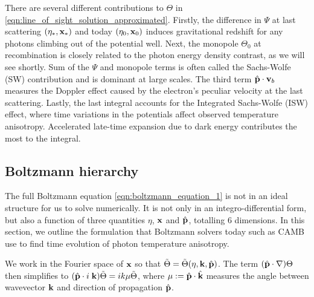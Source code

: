 There are several different contributions to $\Theta$ in \eqref{eqn:line_of_sight_solution_approximated}. Firstly, the difference in $\Psi$ at last scattering $(\eta_*,\mathbf{x}_*)$ and today $(\eta_0, \mathbf{x}_0)$ induces gravitational redshift for any photons climbing out of the potential well. Next, the monopole $\Theta_0$ at recombination is closely related to the photon energy density contrast, as we will see shortly. Sum of the $\Psi$ and monopole terms is often called the Sachs-Wolfe (SW) contribution and is dominant at large scales. The third term $\hat{\mathbf{p}}\cdot\mathbf{v}_b$ measures the Doppler effect caused by the electron's peculiar velocity at the last scattering. Lastly, the last integral accounts for the Integrated Sachs-Wolfe (ISW) effect, where time variations in the potentials affect observed temperature anisotropy. Accelerated late-time expansion due to dark energy contributes the most to the integral.


\subsection{Boltzmann hierarchy} \label{section:boltzmann_hierarchy}

The full Boltzmann equation \eqref{eqn:boltzmann_equation_1} is not in an ideal structure for us to solve numerically. It is not only in an integro-differential form, but also a function of three quantities $\eta$, $\mathbf{x}$ and $\hat{\mathbf{p}}$, totalling 6 dimensions. In this section, we outline the formulation that Boltzmann solvers today such as CAMB \cite{Lewis2000} use to find time evolution of photon temperature anisotropy.

We work in the Fourier space of $\mathbf{x}$ so that $\tilde{\Theta} = \tilde{\Theta}(\eta,\mathbf{k},\hat{\mathbf{p}})$. The term $(\hat{\mathbf{p}}\cdot\nabla)\Theta$ then simplifies to $(\hat{\mathbf{p}}\cdot i\;\mathbf{k})\tilde{\Theta} = ik\mu\tilde{\Theta}$, where $\mu := \hat{\mathbf{p}} \cdot \hat{\mathbf{k}}$ measures the angle between wavevector $\mathbf{k}$ and direction of propagation $\hat{\mathbf{p}}$.

